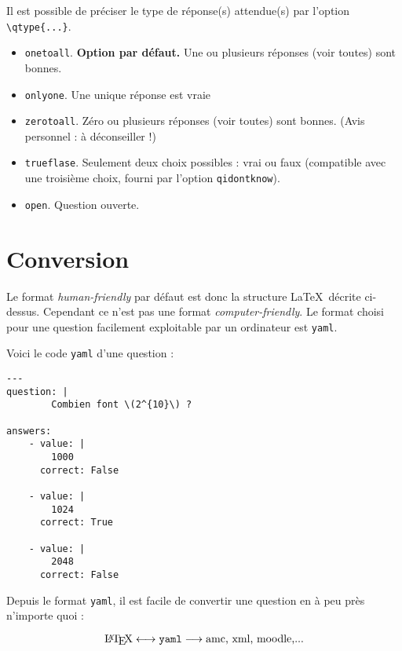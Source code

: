 \documentclass[12pt,a4paper]{article}
\begin{document}
Il est possible de préciser le type de réponse(s) attendue(s) par l'option \verb|\qtype{...}|.

\begin{itemize}
  \item  \verb|onetoall|. \textbf{Option par défaut.} Une ou plusieurs réponses (voir toutes) sont bonnes.
  \item \verb|onlyone|. Une unique réponse est vraie
  \item \verb|zerotoall|. Zéro ou plusieurs réponses (voir toutes) sont bonnes. (Avis personnel : à déconseiller !)
  \item \verb|trueflase|. Seulement deux choix possibles : vrai ou faux (compatible avec une troisième choix, fourni par l'option \verb|qidontknow|).
  \item \verb|open|. Question ouverte.
\end{itemize}  
  







\section{Conversion}


Le format \emph{human-friendly} par défaut est donc la structure \LaTeX\ décrite ci-dessus. Cependant ce n'est pas une format \emph{computer-friendly}. Le format choisi pour une question facilement exploitable par un ordinateur est \texttt{yaml}.

Voici le code \texttt{yaml} d'une question :
\begin{center}
\begin{minipage}{0.8\textwidth}
\begin{verbatim}
---
question: |
        Combien font \(2^{10}\) ?

answers: 
    - value: |
        1000
      correct: False

    - value: |
        1024
      correct: True

    - value: |
        2048
      correct: False
\end{verbatim}
\end{minipage}
\end{center}


Depuis le format \texttt{yaml}, il est facile de convertir une question en à peu près n'importe quoi :

$$\text{\LaTeX} \longleftrightarrow \text{\texttt{yaml}} \longrightarrow \text{amc, xml, moodle,...}$$
\end{document}
